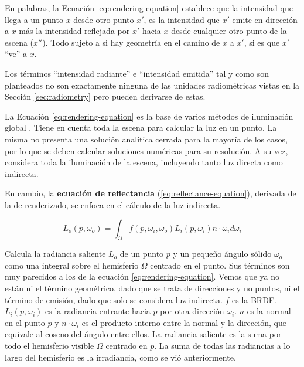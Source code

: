 En palabras, la Ecuación \ref{eq:rendering-equation} establece que la intensidad que llega a un punto $x$ desde otro punto $x'$, es la intensidad que $x'$ emite en dirección a $x$ más la intensidad reflejada por $x'$ hacia $x$ desde cualquier otro punto de la escena ($x''$).
Todo sujeto a si hay geometría en el camino de $x$ a $x'$, si es que $x'$ ``ve'' a $x$.

Los términos ``intensidad radiante'' e ``intensidad emitida'' tal y como son planteados no son exactamente ninguna de las unidades radiométricas vistas en la Sección \ref{sec:radiometry} pero pueden derivarse de estas.

La Ecuación \ref{eq:rendering-equation} es la base de varios métodos de iluminación global \cite[p.~437]{rtr}.
Tiene en cuenta toda la escena para calcular la luz en un punto.
La misma no presenta una solución analítica cerrada para la mayoría de los casos, por lo que se deben calcular soluciones numéricas para su resolución.
A su vez, considera toda la iluminación de la escena, incluyendo tanto luz directa como indirecta.

En cambio, la \textbf{ecuación de reflectancia} (\ref{eq:reflectance-equation}), derivada de la de renderizado, se enfoca en el cálculo de la luz indirecta.

\begin{equation}\label{eq:reflectance-equation}
    L_o(p, \omega_o) = \int_{\Omega}{f(p, \omega_i, \omega_o) L_i(p, \omega_i) n \cdot \omega_i d\omega_i}
\end{equation}

Calcula la radiancia saliente $L_o$ de un punto $p$ y un pequeño ángulo sólido $\omega_o$ como una integral sobre el hemisferio $\Omega$ centrado en el punto.
Sus términos son muy parecidos a los de la ecuación \ref{eq:rendering-equation}.
Vemos que ya no están ni el término geométrico, dado que se trata de direcciones y no puntos, ni el término de emisión, dado que solo se considera luz indirecta.
$f$ es la BRDF.
$L_i(p, \omega_i)$ es la radiancia entrante hacia $p$ por otra dirección $\omega_i$.
$n$ es la normal en el punto $p$ y $n \cdot \omega_i$ es el producto interno entre la normal y la dirección, que equivale al coseno del ángulo entre ellos.
La radiancia saliente es la suma por todo el hemisferio visible $\Omega$ centrado en $p$.
La suma de todas las radiancias a lo largo del hemisferio es la irradiancia, como se vió anteriormente.


